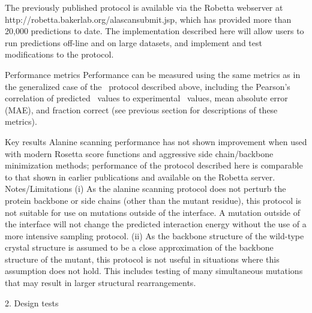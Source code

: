 The previously published protocol \cite{kortemme_simple_2002,kortemme_computational_2004} is available via the Robetta webserver at http://robetta.bakerlab.org/alascansubmit.jsp, which has provided more than 20,000 predictions to date. The implementation described here will allow users to run predictions off-line and on large datasets, and implement and test modifications to the protocol.

Performance metrics
Performance can be measured using the same metrics as in the generalized case of the \ddg\ protocol described above, including the Pearson’s correlation of predicted \ddg\ values to experimental \ddg\ values, mean absolute error (MAE), and fraction correct (see previous section for descriptions of these metrics).

Key results
Alanine scanning performance has not shown improvement when used with modern Rosetta score functions and aggressive side chain/backbone minimization methods; performance of the protocol described here is comparable to that shown in earlier publications \cite{kortemme_simple_2002,kortemme_computational_2004} and available on the Robetta server.
Notes/Limitations
(i) As the alanine scanning protocol does not perturb the protein backbone or side chains (other than the mutant residue), this protocol is not suitable for use on mutations outside of the interface. A mutation outside of the interface will not change the predicted interaction energy without the use of a more intensive sampling protocol. (ii) As the backbone structure of the wild-type crystal structure is assumed to be a close approximation of the backbone structure of the mutant, this protocol is not useful in situations where this assumption does not hold. This includes testing of many simultaneous mutations that may result in larger structural rearrangements.

2. Design tests

